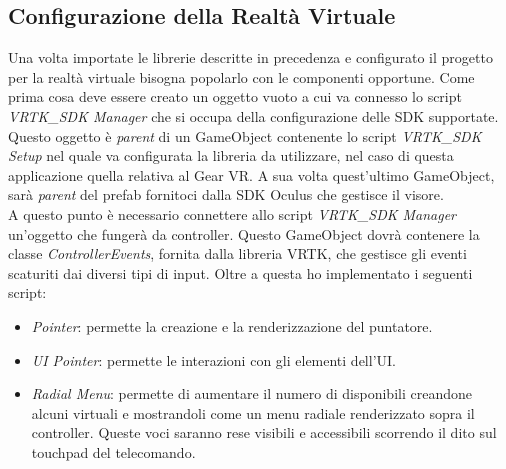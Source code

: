 \subsection{Configurazione della Realtà Virtuale}
Una volta importate le librerie descritte in precedenza e configurato il progetto per la realtà virtuale bisogna popolarlo con le componenti opportune. Come prima cosa deve essere creato un oggetto vuoto a cui va connesso lo script \textit{VRTK\_SDK Manager} che si occupa della configurazione delle SDK supportate. Questo oggetto è \textit{parent} di un GameObject contenente lo script \textit{VRTK\_SDK Setup} nel quale va configurata la libreria da utilizzare, nel caso di questa applicazione quella relativa al Gear VR. A sua volta quest'ultimo GameObject, sarà \textit{parent} del prefab fornitoci dalla SDK Oculus che gestisce il visore. \\
A questo punto è necessario connettere allo script \textit{VRTK\_SDK Manager} un'oggetto che fungerà da controller. Questo GameObject dovrà contenere la classe \textit{ControllerEvents}, fornita dalla libreria VRTK, che gestisce gli eventi scaturiti dai diversi tipi di input. Oltre a questa ho implementato i seguenti script:
\begin{itemize}
	\item  \textit{Pointer}: permette la creazione e la renderizzazione del puntatore.
	\item  \textit{UI Pointer}: permette le interazioni con gli elementi dell'UI.

\end{itemize}
\begin{minipage}[h]{0.75\textwidth}
	\begin{itemize}
		\item \textit{Radial Menu}: permette di aumentare il numero di  disponibili creandone alcuni virtuali e mostrandoli come un menu radiale renderizzato sopra il controller. Queste voci saranno rese visibili e accessibili scorrendo il dito sul touchpad del telecomando.
	\end{itemize}
\end{minipage}
\hfill
